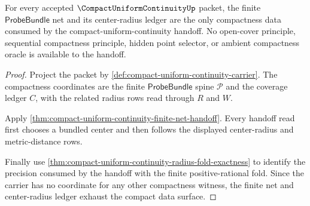 \begin{theorem}
\label{thm:compact-uniform-continuity-root-compact-net-row}
For every accepted $\CompactUniformContinuityUp$ packet, the finite $\mathsf{ProbeBundle}$ net and its center-radius ledger are the only compactness data consumed by the compact-uniform-continuity handoff. No open-cover principle, sequential compactness principle, hidden point selector, or ambient compactness oracle is available to the handoff.
\end{theorem}
\begin{proof}
Project the packet by \autoref{def:compact-uniform-continuity-carrier}. The compactness coordinates are the finite $\mathsf{ProbeBundle}$ spine $\mathcal{P}$ and the coverage ledger $C$, with the related radius rows read through $R$ and $W$.

Apply \autoref{thm:compact-uniform-continuity-finite-net-handoff}. Every handoff read first chooses a bundled center and then follows the displayed center-radius and metric-distance rows.

Finally use \autoref{thm:compact-uniform-continuity-radius-fold-exactness} to identify the precision consumed by the handoff with the finite positive-rational fold. Since the carrier has no coordinate for any other compactness witness, the finite net and center-radius ledger exhaust the compact data surface.
\end{proof}

